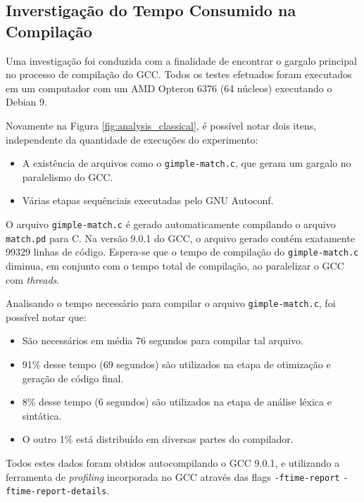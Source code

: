 \subsection{Inverstigação do Tempo Consumido na Compilação}

Uma investigação foi conduzida com a finalidade de encontrar o gargalo
principal no processo de compilação do GCC. Todos os testes efetuados foram
executados em um computador com um AMD Opteron 6376 (64 núcleos) executando
o Debian 9.

Novamente na Figura \ref{fig:analysis_classical}, é possível notar dois
itens, independente da quantidade de execuções do experimento:

\begin{itemize}
    \item A existência de arquivos como o \texttt{gimple-match.c}, que
        geram um gargalo no paralelismo do GCC.

    \item Várias etapas sequênciais executadas pelo GNU Autoconf.
\end{itemize}

O arquivo \texttt{gimple-match.c} é gerado automaticamente compilando
o arquivo \texttt{match.pd} para C. Na versão 9.0.1 do GCC, o arquivo
gerado contém exatamente 99329 linhas de código. Espera-se que o tempo
de compilação do \texttt{gimple-match.c} diminua, em conjunto com o tempo
total de compilação, ao paralelizar o GCC com \textit{threads}.

Analisando o tempo necessário para compilar o arquivo \texttt{gimple-match.c},
foi possível notar que:
\begin{itemize}
    \item São necessários em média 76 segundos para compilar tal arquivo.

    \item 91\% desse tempo (69 segundos) são utilizados na etapa de otimização
        e geração de código final.

    \item 8\% desse tempo (6 segundos) são utilizados na etapa de análise léxica
        e sintática.

    \item O outro 1\% está distribuído em diversas partes do compilador.
\end{itemize}
Todos estes dados foram obtidos autocompilando o GCC 9.0.1, e utilizando a
ferramenta de \textit{profiling} incorporada
no GCC através das flags \texttt{-ftime-report} \texttt{-ftime-report-details}.

